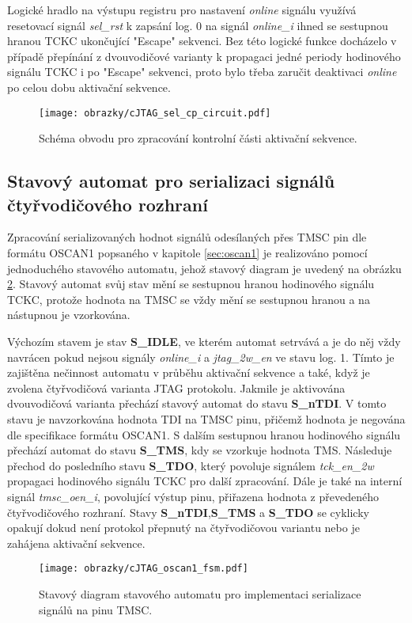 Logické hradlo na výstupu registru pro nastavení \textit{online} signálu využívá resetovací signál \textit{sel\_rst} k zapsání log. 0 na signál \textit{online\_i} ihned se sestupnou hranou TCKC ukončující "Escape" sekvenci. Bez této logické funkce docházelo v případě přepínání z dvouvodičové varianty k propagaci jedné periody hodinového signálu TCKC i po "Escape" sekvenci, proto bylo třeba zaručit deaktivaci \textit{online} po celou dobu aktivační sekvence.

\begin{figure}[!h]
  \begin{center}
    \texttt{[image: obrazky/cJTAG\_sel\_cp\_circuit.pdf]}
  \end{center}
  \caption{Schéma obvodu pro zpracování kontrolní části aktivační sekvence.}
	\label{fig:cJTAG_sel_cp_circuit}
\end{figure}

\subsection{Stavový automat pro serializaci signálů čtyřvodičového rozhraní}	\label{subsec:oscan1_fsm}
Zpracování serializovaných hodnot signálů odesílaných přes TMSC pin dle formátu OSCAN1 popsaného v kapitole \ref{sec:oscan1} je realizováno pomocí jednoduchého stavového automatu, jehož stavový diagram je uvedený na obrázku \ref{fig:cJTAG_oscan1_fsm}. Stavový automat svůj stav mění se sestupnou hranou hodinového signálu TCKC, protože hodnota na TMSC se vždy mění se sestupnou hranou a na nástupnou je vzorkována.

Výchozím stavem je stav \textbf{S\_IDLE}, ve kterém automat setrvává a je do něj vždy navrácen pokud nejsou signály \textit{online\_i} a \textit{jtag\_2w\_en} ve stavu log. 1. Tímto je zajištěna nečinnost automatu v průběhu aktivační sekvence a také, když je zvolena čtyřvodičová varianta \acs{JTAG} protokolu. Jakmile je aktivována dvouvodičová varianta přechází stavový automat do stavu \textbf{S\_nTDI}. V tomto stavu je navzorkována hodnota TDI na TMSC pinu, přičemž hodnota je negována dle specifikace formátu OSCAN1. S dalším sestupnou hranou hodinového signálu přechází automat do stavu \textbf{S\_TMS}, kdy se vzorkuje hodnota TMS. Následuje přechod do posledního stavu \textbf{S\_TDO}, který povoluje signálem \textit{tck\_en\_2w} propagaci hodinového signálu TCKC pro další zpracování. Dále je také na interní signál \textit{tmsc\_oen\_i}, povolující výstup pinu, přiřazena hodnota z převedeného čtyřvodičového rozhraní. Stavy \textbf{S\_nTDI},\textbf{S\_TMS} a \textbf{S\_TDO} se cyklicky opakují dokud není protokol přepnutý na čtyřvodičovou variantu nebo je zahájena aktivační sekvence.

\begin{figure}[!h]
  \begin{center}
    \texttt{[image: obrazky/cJTAG\_oscan1\_fsm.pdf]}
  \end{center}
  \caption{Stavový diagram stavového automatu pro implementaci serializace signálů na pinu TMSC.}
	\label{fig:cJTAG_oscan1_fsm}
\end{figure}